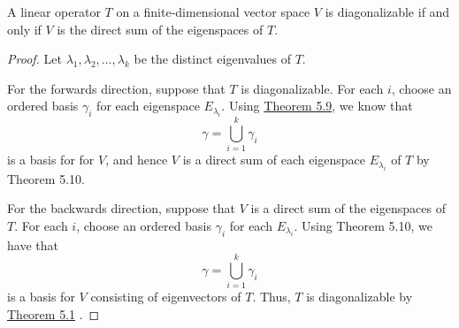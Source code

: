 \begin{theorem}
    A linear operator \( T  \) on a finite-dimensional vector space \( V  \) is diagonalizable if and only if \( V  \) is the direct sum of the eigenspaces of \( T  \).
\end{theorem}
\begin{proof}
    Let \( {\lambda}_{1}, {\lambda}_{2}, \dots, {\lambda}_{k} \) be the distinct eigenvalues of \( T  \).
    
    For the forwards direction, suppose that \( T  \) is diagonalizable. For each \( i  \), choose an ordered basis \( {\gamma}_{i} \) for each eigenspace \( {E}_{{\lambda}_{i}} \). Using {\hyperref[Theorem 5.9]{Theorem 5.9}}, we know that 
    \[  \gamma = \bigcup_{ i=1  }^{ k  }  {\gamma}_{i}   \]
    is a basis for for \( V  \), and hence \( V  \) is a direct sum of each eigenspace \( {E}_{{\lambda}_{i}}  \) of \( T  \) by Theorem 5.10.

    For the backwards direction, suppose that \( V  \) is a direct sum of the eigenspaces of \( T  \). For each \( i  \), choose an ordered basis \( {\gamma}_{i}  \) for each \( {E}_{{\lambda}_{i}}  \). Using Theorem 5.10,  
    we have that
    \[  \gamma = \bigcup_{ i=1  }^{ k  }  {\gamma}_{i}   \]
    is a basis for \( V  \) consisting of eigenvectors of \( T  \). Thus, \( T  \) is diagonalizable by {\hyperref[Theorem 5.1]{Theorem 5.1}} .
\end{proof}
